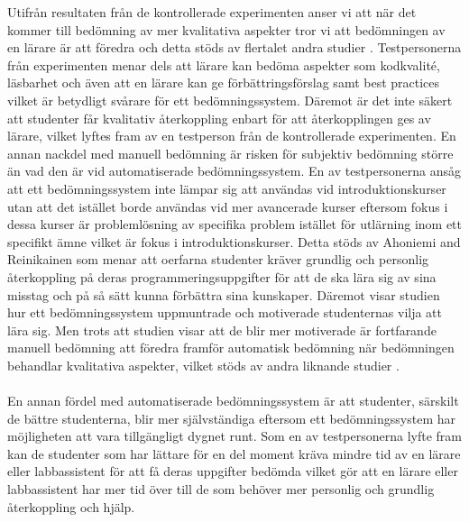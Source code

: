 \documentclass[a4paper,11pt]{article}
\begin{document}
{Utifrån resultaten från de kontrollerade experimenten anser vi att när det kommer till bedömning av mer kvalitativa aspekter tror vi att bedömningen av en lärare är att föredra och detta stöds av flertalet andra studier \cite{pieterse} \cite{ala-mutka} \cite{carter}. Testpersonerna från experimenten menar dels att lärare kan bedöma aspekter som kodkvalité, läsbarhet och även att en lärare kan ge förbättringsförslag samt best practices vilket är betydligt svårare för ett bedömningssystem. Däremot är det inte säkert att studenter får kvalitativ återkoppling enbart för att återkopplingen ges av lärare, vilket lyftes fram av en testperson från de kontrollerade experimenten. En annan nackdel med manuell bedömning är risken för subjektiv bedömning större än vad den är vid automatiserade bedömningssystem. En av testpersonerna ansåg att ett bedömningssystem inte lämpar sig att användas vid introduktionskurser utan att det istället borde användas vid mer avancerade kurser eftersom fokus i dessa kurser är problemlösning av specifika problem istället för utlärning inom ett specifikt ämne vilket är fokus i introduktionskurser. Detta stöds av Ahoniemi and Reinikainen \cite{ahoniemi_aloha} som menar att oerfarna studenter kräver grundlig och personlig återkoppling på deras programmeringsuppgifter för att de ska lära sig av sina misstag och på så sätt kunna förbättra sina kunskaper. Däremot visar studien \cite{law_lee_yu} hur ett bedömningssystem uppmuntrade och motiverade studenternas vilja att lära sig. Men trots att studien visar att de blir mer motiverade är fortfarande manuell bedömning att föredra framför automatisk bedömning när bedömningen behandlar kvalitativa aspekter, vilket stöds av andra liknande studier \cite{pieterse} \cite{ala-mutka} \cite{carter}.
\\
\\
En annan fördel med automatiserade bedömningssystem är att studenter, särskilt de bättre studenterna, blir mer självständiga eftersom ett bedömningssystem har möjligheten att vara tillgängligt dygnet runt. Som en av testpersonerna lyfte fram kan de studenter som har lättare för en del moment kräva mindre tid av en lärare eller labbassistent för att få deras uppgifter bedömda vilket gör att en lärare eller labbassistent har mer tid över till de som behöver mer personlig och grundlig återkoppling och hjälp.
\\
\\
}
\end{document}
